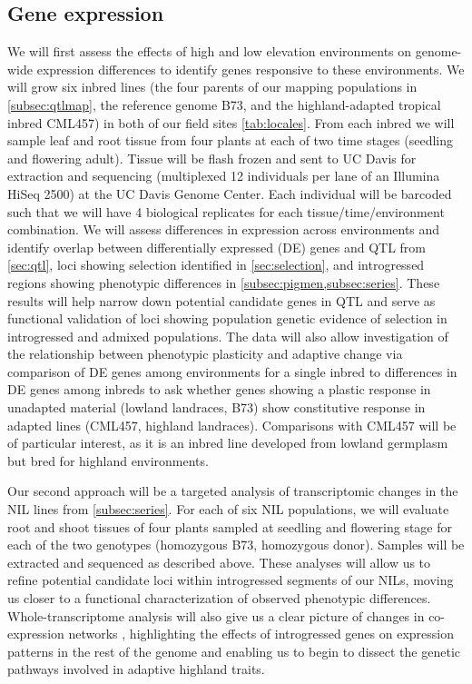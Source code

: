 \subsection{Gene expression} \label{subsec:rnaseq}


We will first assess the effects of high and low elevation environments on genome-wide expression differences to identify genes responsive to these environments.  We will grow six inbred lines (the four parents of our mapping populations in  \ref{subsec:qtlmap}, the reference genome B73, and the highland-adapted tropical inbred CML457) in both of our field sites \ref{tab:locales}.  From each inbred we will sample leaf and root tissue from four plants at each of two time stages (seedling and flowering adult). Tissue will be flash frozen and sent to UC Davis for extraction and sequencing (multiplexed 12 individuals per lane of an Illumina HiSeq 2500) at the UC Davis Genome Center. Each individual will be barcoded such that we will have 4 biological replicates for each tissue/time/environment combination. We will assess differences in expression across environments and identify overlap between differentially expressed (DE) genes and QTL from \ref{sec:qtl}, loci showing selection identified in \ref{sec:selection}, and introgressed regions showing phenotypic differences in \ref{subsec:pigmen,subsec:series}.   These results will help narrow down potential candidate genes in QTL and serve as functional validation of loci showing population genetic evidence of selection in introgressed and admixed populations.  The data will also allow investigation of the relationship between phenotypic plasticity and adaptive change \citep[c.f.][]{Rosas26082013} via comparison of DE genes among environments for a single inbred to differences in DE genes among inbreds to ask whether genes showing a plastic response in unadapted material (lowland landraces, B73) show constitutive response in adapted lines (CML457, highland landraces).  Comparisons with CML457 will be of particular interest, as it is an inbred line developed from lowland germplasm but bred for highland environments.

Our second approach will be a targeted analysis of transcriptomic changes in the NIL lines from \ref{subsec:series}.  For each of six NIL populations, we will evaluate root and shoot tissues of four plants sampled at seedling and flowering stage for each of the two genotypes (homozygous B73, homozygous donor).  Samples will be extracted and sequenced as described above. These analyses will allow us to refine potential candidate loci within introgressed segments of our NILs, moving us closer to a functional characterization of observed phenotypic differences. Whole-transcriptome analysis will also give us a clear picture of changes in co-expression networks \citep[c.f.][]{Swanson-Wagner02072012}, highlighting the effects of introgressed genes on expression patterns in the rest of the genome and enabling us to begin to dissect the genetic pathways involved in adaptive highland traits.


